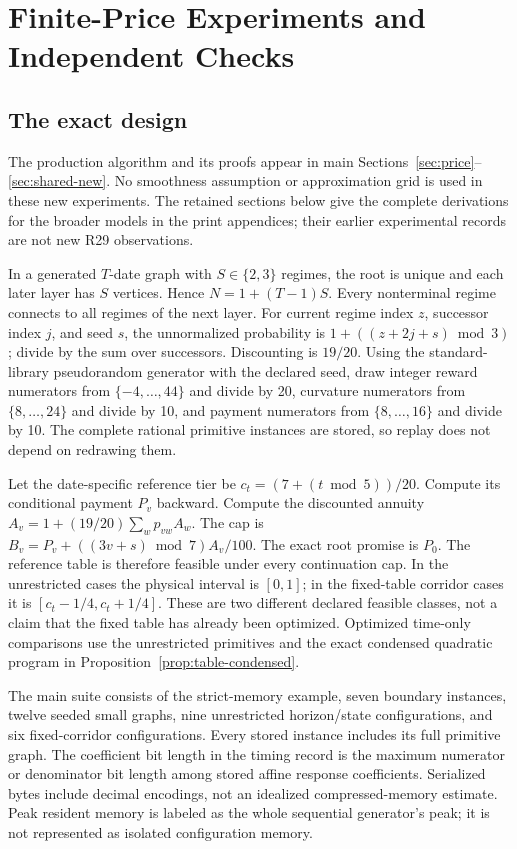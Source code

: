 \section{Finite-Price Experiments and Independent Checks}\label{ec:r29-checks}
\subsection{The exact design}
The production algorithm and its proofs appear in main Sections~\ref{sec:price}--\ref{sec:shared-new}. No smoothness assumption or approximation grid is used in these new experiments. The retained sections below give the complete derivations for the broader models in the print appendices; their earlier experimental records are not new R29 observations.

In a generated $T$-date graph with $S\in\{2,3\}$ regimes, the root is unique and each later layer has $S$ vertices. Hence $N=1+(T-1)S$. Every nonterminal regime connects to all regimes of the next layer. For current regime index $z$, successor index $j$, and seed $s$, the unnormalized probability is $1+((z+2j+s)\bmod3)$; divide by the sum over successors. Discounting is $19/20$. Using the standard-library pseudorandom generator with the declared seed, draw integer reward numerators from $\{-4,\ldots,44\}$ and divide by 20, curvature numerators from $\{8,\ldots,24\}$ and divide by 10, and payment numerators from $\{8,\ldots,16\}$ and divide by 10. The complete rational primitive instances are stored, so replay does not depend on redrawing them.

Let the date-specific reference tier be $c_t=(7+(t\bmod5))/20$. Compute its conditional payment $P_v$ backward. Compute the discounted annuity $A_v=1+(19/20)\sum_wp_{vw}A_w$. The cap is $B_v=P_v+((3v+s)\bmod7)A_v/100$. The exact root promise is $P_0$. The reference table is therefore feasible under every continuation cap. In the unrestricted cases the physical interval is $[0,1]$; in the fixed-table corridor cases it is $[c_t-1/4,c_t+1/4]$. These are two different declared feasible classes, not a claim that the fixed table has already been optimized. Optimized time-only comparisons use the unrestricted primitives and the exact condensed quadratic program in Proposition~\ref{prop:table-condensed}.

The main suite consists of the strict-memory example, seven boundary instances, twelve seeded small graphs, nine unrestricted horizon/state configurations, and six fixed-corridor configurations. Every stored instance includes its full primitive graph. The coefficient bit length in the timing record is the maximum numerator or denominator bit length among stored affine response coefficients. Serialized bytes include decimal encodings, not an idealized compressed-memory estimate. Peak resident memory is labeled as the whole sequential generator's peak; it is not represented as isolated configuration memory.

